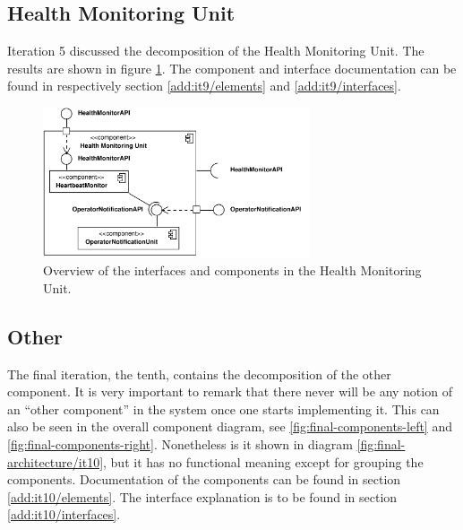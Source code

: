 \subsection{Health Monitoring Unit}

\npar Iteration 5 discussed the decomposition of the Health Monitoring Unit. The
results are shown in figure \ref{fig:final-architecture/it9}. The component and
interface documentation can be found in respectively section
\ref{add:it9/elements} and \ref{add:it9/interfaces}.

\begin{figure}
	\begin{centering}
		\includegraphics[width=0.7\textwidth]{figs/add-it9-interfaces.pdf}
		\caption{Overview of the interfaces and components in the Health Monitoring
		Unit.}
		\label{fig:final-architecture/it9}
	\end{centering}
\end{figure}

\subsection{Other}

\npar The final iteration, the tenth, contains the decomposition of the other
component. It is very important to remark that there never will be any notion of
an ``other component'' in the system once one starts implementing it. This can
also be seen in the overall component diagram, see
\ref{fig:final-components-left} and \ref{fig:final-components-right}.
Nonetheless is it shown in diagram \ref{fig:final-architecture/it10}, but it has
no functional meaning except for grouping the components. Documentation of the
components can be found in section \ref{add:it10/elements}. The interface
explanation is to be found in section \ref{add:it10/interfaces}.

